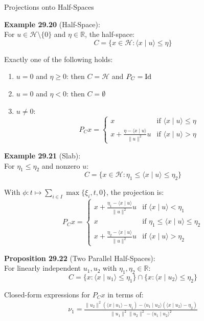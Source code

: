 \documentclass[aspectratio=169,10pt]{beamer}
\begin{document}
\begin{frame}[allowframebreaks]{Projections onto Half-Spaces}

    \textbf{Example 29.20} (Half-Space):\\
    For $u \in \mathcal{H} \setminus \{0\}$ and $\eta \in \mathbb{R}$, the half-space:
    $$C = \{x \in \mathcal{H} : \langle x \mid u \rangle \leq \eta\}$$

    Exactly one of the following holds:

    \begin{enumerate}
        \item[(i)] $u = 0$ and $\eta \geq 0$: then $C = \mathcal{H}$ and $P_C = {\rm Id}$
        \item[(ii)] $u = 0$ and $\eta < 0$: then $C = \emptyset$
        \item[(iii)] $u \neq 0$:
        $$P_C x = \begin{cases}
        x & \text{if } \langle x \mid u \rangle \leq \eta \\
        x + \frac{\eta - \langle x \mid u \rangle}{\|u\|^2} u & \text{if } \langle x \mid u \rangle > \eta
        \end{cases}$$
    \end{enumerate}

    \framebreak

    \textbf{Example 29.21} (Slab):\\
    For $\eta_1 \leq \eta_2$ and nonzero $u$:
    $$C = \{x \in \mathcal{H} : \eta_1 \leq \langle x \mid u \rangle \leq \eta_2\}$$

    With $\phi: t \mapsto \sum_{i \in I} \max\{\xi_i, t, 0\}$, the projection is:
    $$P_C x = \begin{cases}
    x + \frac{\eta_1 - \langle x \mid u \rangle}{\|u\|^2} u & \text{if } \langle x \mid u \rangle < \eta_1 \\
    x & \text{if } \eta_1 \leq \langle x \mid u \rangle \leq \eta_2 \\
    x + \frac{\eta_2 - \langle x \mid u \rangle}{\|u\|^2} u & \text{if } \langle x \mid u \rangle > \eta_2
    \end{cases}$$

    \vspace{0.3cm}

    \framebreak

    \textbf{Proposition 29.22} (Two Parallel Half-Spaces):\\
    For linearly independent $u_1, u_2$ with $\eta_1, \eta_2 \in \mathbb{R}$:
    $$C = \{x : \langle x \mid u_1 \rangle \leq \eta_1\} \cap \{x : \langle x \mid u_2 \rangle \leq \eta_2\}$$

    Closed-form expressions for $P_C x$ in terms of:
    \begin{align*}
    \nu_1 = \frac{\|u_2\|^2(\langle x \mid u_1 \rangle - \eta_1) - \langle u_1 \mid u_2 \rangle(\langle x \mid u_2 \rangle - \eta_2)}{\|u_1\|^2\|u_2\|^2 - \langle u_1 \mid u_2 \rangle^2}
    \end{align*}

\end{frame}
\end{document}
